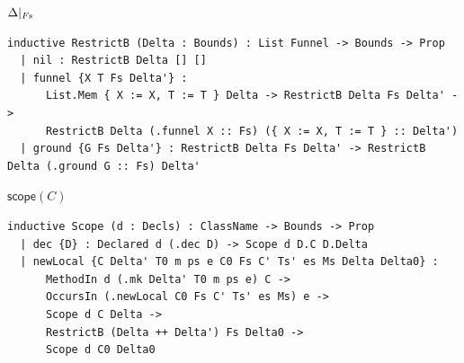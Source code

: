 \begin{cmp}{$\Delta|_{F\mkern-2mu s}$}
\begin{paperside}
\end{paperside}
\begin{leanside}
\begin{lstlisting}[style=leanside]
inductive RestrictB (Delta : Bounds) : List Funnel -> Bounds -> Prop
  | nil : RestrictB Delta [] []
  | funnel {X T Fs Delta'} :
      List.Mem { X := X, T := T } Delta -> RestrictB Delta Fs Delta' ->
      RestrictB Delta (.funnel X :: Fs) ({ X := X, T := T } :: Delta')
  | ground {G Fs Delta'} : RestrictB Delta Fs Delta' -> RestrictB Delta (.ground G :: Fs) Delta'
\end{lstlisting}
\end{leanside}
\end{cmp}

\begin{cmp}{$\mathsf{scope}(C)$}
\begin{paperside}
\end{paperside}
\begin{leanside}
\begin{lstlisting}[style=leanside]
inductive Scope (d : Decls) : ClassName -> Bounds -> Prop
  | dec {D} : Declared d (.dec D) -> Scope d D.C D.Delta
  | newLocal {C Delta' T0 m ps e C0 Fs C' Ts' es Ms Delta Delta0} :
      MethodIn d (.mk Delta' T0 m ps e) C ->
      OccursIn (.newLocal C0 Fs C' Ts' es Ms) e ->
      Scope d C Delta ->
      RestrictB (Delta ++ Delta') Fs Delta0 ->
      Scope d C0 Delta0
\end{lstlisting}
\end{leanside}
\end{cmp}


